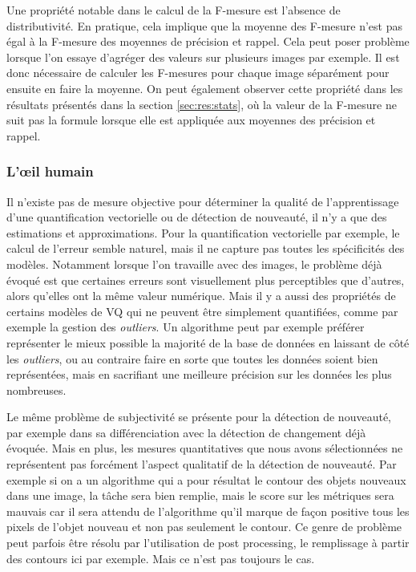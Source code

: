 	Une propriété notable dans le calcul de la F-mesure est l'absence de distributivité. En pratique, cela implique que la moyenne des F-mesure n'est pas égal à la F-mesure des moyennes de précision et rappel. Cela peut poser problème lorsque l'on essaye d'agréger des valeurs sur plusieurs images par exemple. Il est donc nécessaire de calculer les F-mesures pour chaque image séparément pour ensuite en faire la moyenne. On peut également observer cette propriété dans les résultats présentés dans la section \ref{sec:res:stats}, où la valeur de la F-mesure ne suit pas la formule lorsque elle est appliquée aux moyennes des précision et rappel.

	\subsubsection{L'œil humain}

	Il n'existe pas de mesure objective pour déterminer la qualité de l'apprentissage d'une quantification vectorielle ou de détection de nouveauté, il n'y a que des estimations et approximations. Pour la quantification vectorielle par exemple, le calcul de l'erreur semble naturel, mais il ne capture pas toutes les spécificités des modèles. Notamment lorsque l'on travaille avec des images, le problème déjà évoqué est que certaines erreurs sont visuellement plus perceptibles que d'autres, alors qu'elles ont la même valeur numérique. Mais il y a aussi des propriétés de certains modèles de VQ qui ne peuvent être simplement quantifiées, comme par exemple la gestion des \textit{outliers}. Un algorithme peut par exemple préférer représenter le mieux possible la majorité de la base de données en laissant de côté les \textit{outliers}, ou au contraire faire en sorte que toutes les données soient bien représentées, mais en sacrifiant une meilleure précision sur les données les plus nombreuses. 
	
	Le même problème de subjectivité se présente pour la détection de nouveauté, par exemple dans sa différenciation avec la détection de changement déjà évoquée. Mais en plus, les mesures quantitatives que nous avons sélectionnées ne représentent pas forcément l'aspect qualitatif de la détection de nouveauté. Par exemple si on a un algorithme qui a pour résultat le contour des objets nouveaux dans une image, la tâche sera bien remplie, mais le score sur les métriques sera mauvais car il sera attendu de l'algorithme qu'il marque de façon positive tous les pixels de l'objet nouveau et non pas seulement le contour. Ce genre de problème peut parfois être résolu par l'utilisation de post processing, le remplissage à partir des contours ici par exemple. Mais ce n'est pas toujours le cas.

